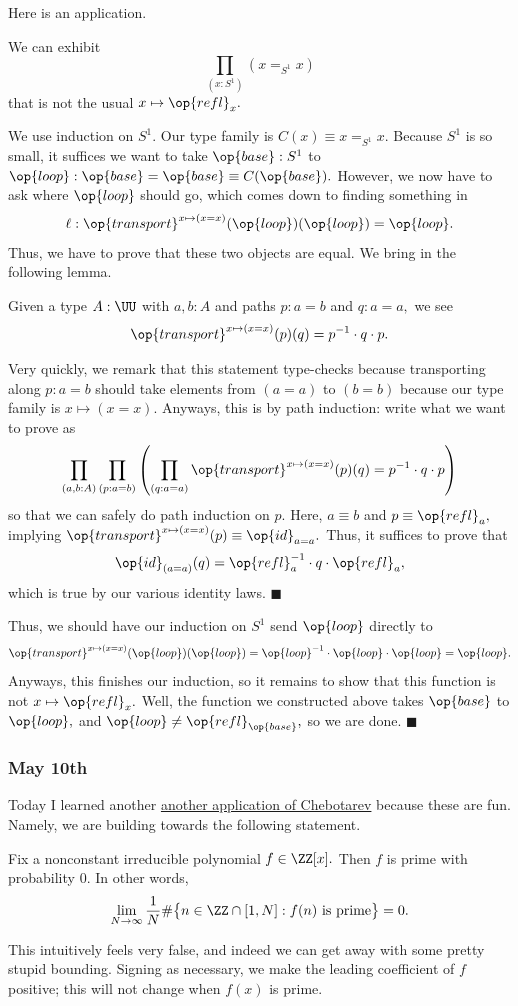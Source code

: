 Here is an application.
\begin{proposition}
    We can exhibit
    \[\prod_{\left(x:S^1\right)}(x=_{S^1}x)\]
    that is not the usual $x\mapsto\op{refl}_x.$
\end{proposition}
We use induction on $S^1.$ Our type family is $C(x)\equiv x=_{S^1}x.$ Because $S^1$ is so small, it suffices we want to take $\op{base}:S^1$ to $\op{loop}:\op{base}=\op{base}\equiv C(\op{base}).$ However, we now have to ask where $\op{loop}$ should go, which comes down to finding something in
\[\ell:\op{transport}^{x\mapsto(x=x)}(\op{loop})(\op{loop})=\op{loop}.\]
Thus, we have to prove that these two objects are equal. We bring in the following lemma.
\begin{lemma}
    Given a type $A:\UU$ with $a,b:A$ and paths $p:a=b$ and $q:a=a,$ we see
    \[\op{transport}^{x\mapsto(x=x)}(p)(q)=p^{-1}\cdot q\cdot p.\]
\end{lemma}
Very quickly, we remark that this statement type-checks because transporting along $p:a=b$ should take elements from $(a=a)$ to $(b=b)$ because our type family is $x\mapsto(x=x).$ Anyways, this is by path induction: write what we want to prove as
\[\prod_{(a,b:A)}\prod_{(p:a=b)}\left(\prod_{(q:a=a)}\op{transport}^{x\mapsto(x=x)}(p)(q)=p^{-1}\cdot q\cdot p\right)\]
so that we can safely do path induction on $p.$ Here, $a\equiv b$ and $p\equiv\op{refl}_a,$ implying $\op{transport}^{x\mapsto(x=x)}(p)\equiv\op{id}_{a=a}.$ Thus, it suffices to prove that
\[\op{id}_{(a=a)}(q)=\op{refl}_a^{-1}\cdot q\cdot\op{refl}_a,\]
which is true by our various identity laws. $\blacksquare$

Thus, we should have our induction on $S^1$ send $\op{loop}$ directly to
\[\op{transport}^{x\mapsto(x=x)}(\op{loop})(\op{loop})=\op{loop}^{-1}\cdot\op{loop}\cdot\op{loop}=\op{loop}.\]
Anyways, this finishes our induction, so it remains to show that this function is not $x\mapsto\op{refl}_x.$ Well, the function we constructed above takes $\op{base}$ to $\op{loop},$ and $\op{loop}\ne\op{refl}_{\op{base}},$ so we are done. $\blacksquare$

\subsubsection{May 10th}
Today I learned another \href{https://mathoverflow.net/a/203520}{another application of Chebotarev} because these are fun. Namely, we are building towards the following statement.
\begin{theorem}
    Fix a nonconstant irreducible polynomial $f\in\ZZ[x].$ Then $f$ is prime with probability $0.$ In other words,
    \[\lim_{N\to\infty}\frac1N\#\big\{n\in\ZZ\cap[1,N]:f(n)\text{ is prime}\big\}=0.\]
\end{theorem}
This intuitively feels very false, and indeed we can get away with some pretty stupid bounding. Signing as necessary, we make the leading coefficient of $f$ positive; this will not change when $f(x)$ is prime.

